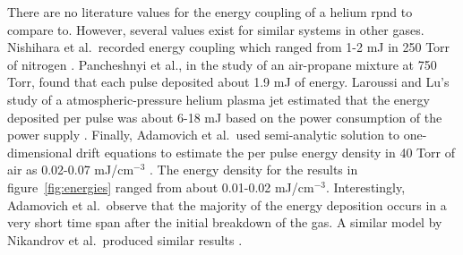 There are no literature values for the energy coupling of a helium \acs{rpnd} to
compare to. However, several values exist for similar systems in other gases.
Nishihara et al.\ recorded energy coupling which ranged from 1-2 mJ in 250 Torr
of nitrogen \cite{Nishihara2006}. Pancheshnyi et al., in the study of an
air-propane mixture at 750 Torr, found that each pulse deposited about 1.9 mJ of
energy. Laroussi and Lu's study of a atmospheric-pressure helium plasma jet
estimated that the energy deposited per pulse was about 6-18 mJ based on the
power consumption of the power supply \cite{Laroussi2005}. Finally, Adamovich et
al.\ used semi-analytic solution to one-dimensional drift equations to estimate
the per pulse energy density in 40 Torr of air as 0.02-0.07 mJ/cm$^{-3}$
\cite{Adamovich2009}. The energy density for the results in
figure~\ref{fig:energies} ranged from about 0.01-0.02 mJ/cm$^{-3}$.
Interestingly, Adamovich et al.\ observe that the majority of the energy
deposition occurs in a very short time span after the initial breakdown of the
gas. A similar model by Nikandrov et al.\ produced similar results
\cite{Nikandrov2008}.
